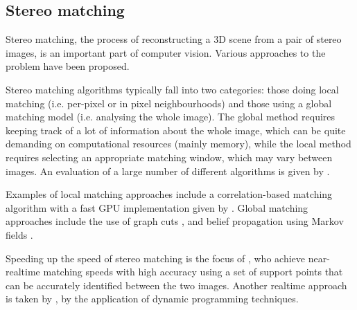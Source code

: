 \subsection{Stereo matching}
\label{sec:stereo-prior}


Stereo matching, the process of reconstructing a 3D scene from a pair of stereo
images, is an important part of computer vision. Various approaches to the
problem have been proposed.

Stereo matching algorithms typically fall into two categories: those doing local
matching (i.e. per-pixel or in pixel neighbourhoods) and those using a global
matching model (i.e. analysing the whole image). The global method requires
keeping track of a lot of information about the whole image, which can be quite
demanding on computational resources (mainly memory), while the local method
requires selecting an appropriate matching window, which may vary between
images. An evaluation of a large number of different algorithms is given by
\citet{scharstein02:_taxon_evaluat_dense_two_frame}.

Examples of local matching approaches include a correlation-based matching
algorithm with a fast GPU implementation given by \citet{weber09}. Global
matching approaches include the use of graph cuts
\cite{kolmogorov01:_comput}, and belief propagation using Markov fields
\cite{felzenszwalb06:_effic_belief_propag_early_vision}.

Speeding up the speed of stereo matching is the focus of
\citet{geiger11:_effic_large_scale_stereo_match}, who achieve near-realtime
matching speeds with high accuracy using a set of support points that can be
accurately identified between the two images. Another realtime approach is taken
by \citet{realtimestereo}, by the application of dynamic programming techniques.


